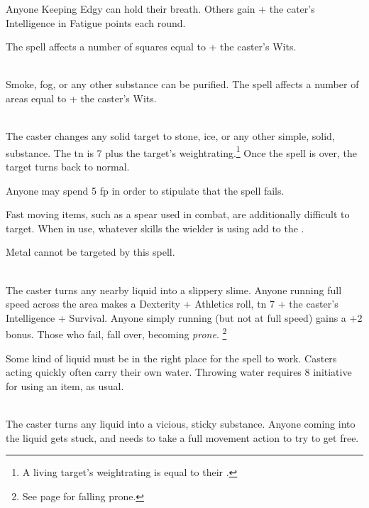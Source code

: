 \begin{multicols}{2}
Anyone Keeping Edgy can hold their breath.  Others gain  + the cater's Intelligence in Fatigue points each \gls{round}.

The spell affects a number of squares equal to  + the caster's Wits.

\\
Smoke, fog, or any other substance can be purified.  The spell affects a number of areas equal to  + the caster's Wits.

\\
The caster changes any solid target to stone, ice, or any other simple, solid, substance.  The \gls{tn} is 7 plus the target's \gls{weightrating}.\footnote{A living target's \gls{weightrating} is equal to their .}
Once the spell is over, the target turns back to normal.

Anyone may spend 5 \gls{fp} in order to stipulate that the spell fails.

Fast moving items, such as a spear used in combat, are additionally difficult to target.  When in use, whatever skills the wielder is using add to the .

Metal cannot be targeted by this spell.

\\
The caster turns any nearby liquid into a slippery slime.
Anyone running full speed across the area makes a Dexterity + Athletics roll, \gls{tn} 7 + the caster's Intelligence + Survival.
Anyone simply running (but not at full speed) gains a +2 bonus.
Those who fail, fall over, becoming \textit{prone}.%
\footnote{See page \pageref{prone} for falling prone.}

Some kind of liquid must be in the right place for the spell to work.
Casters acting quickly often carry their own water.  Throwing water requires 8 initiative for using an item, as usual.

\\
The caster turns any liquid into a vicious, sticky substance.
Anyone coming into the liquid gets stuck, and needs to take a full movement action to try to get free.


\end{multicols}
